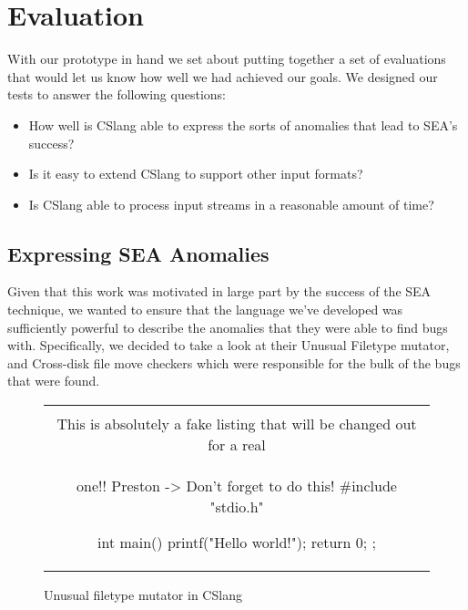 \section{Evaluation}
\label{SEC:evaluation}

With our prototype in hand we set about putting together a set of
evaluations that would let us know how well we had achieved our goals.
We designed our tests to answer the following questions:

\begin{itemize}

  \item{How well is CSlang able to express the sorts of anomalies that lead
    to SEA's success?}

  \item{Is it easy to extend CSlang to support other input formats?}


  \item{Is CSlang able to process input streams in a reasonable amount of
    time?}

\end{itemize}


\subsection{Expressing SEA Anomalies}

Given that this work was motivated
in large part
by the success of the SEA technique,
we wanted to ensure that
the language we've developed
was sufficiently powerful
to describe the anomalies that they were able to find bugs with.
Specifically, we decided to take a look at their Unusual Filetype mutator,
and Cross-disk file move checkers which were responsible for the bulk of
the bugs that were found.

\begin{figure}[H]
\centering
\begin{tabular}{c}
\begin{lstlisting}
\\ This is absolutely a fake listing that will be changed out for a real
\\ one!!  Preston -> Don't forget to do this!
#include "stdio.h"

int main() {
    printf("Hello world!\n");
    return 0;
};
\end{lstlisting}
\end{tabular}
\caption{Unusual filetype mutator in CSlang}
\label{lst:UnusualFiletypeCSlang}
\end{figure}

